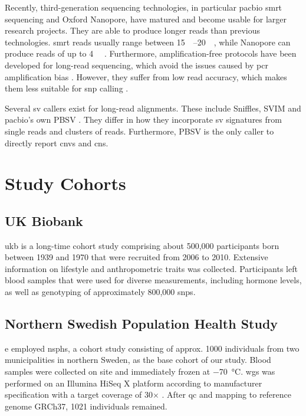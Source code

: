 \documentclass[twoside=false]{scrbook}
\begin{document}
Recently, third-generation sequencing technologies, in particular \gls{pacbio} \gls{smrt} sequencing and Oxford Nanopore, have matured and become usable for larger research projects.
They are able to produce longer reads than previous technologies.
\Gls{smrt} reads usually range between \qtyrange{15}{20}{\kilo\base}, while Nanopore can produce reads of up to \qty{4}{\mega\base} \cite{Wenger2019,Payne2019}.
Furthermore, amplification-free protocols have been developed for long-read sequencing, which avoid the issues caused by \gls{pcr} amplification bias \cite{Hoijer2018}.
However, they suffer from low read accuracy, which makes them less suitable for \gls{snp} calling \cite{Rang2018}.

Several \gls{sv} callers exist for long-read alignments.
These include \textsf{Sniffles}, \textsf{SVIM} and \gls{pacbio}'s own \textsf{PBSV} \cite{Heller2019a,Sedlazeck2018a}.
They differ in how they incorporate \gls{sv} signatures from single reads and clusters of reads.
Furthermore, \textsf{PBSV} is the only caller to directly report \glspl{cnv} and \glspl{cn}.

\section{Study Cohorts}
\subsection{UK Biobank}
\Gls{ukb} is a long-time cohort study comprising about 500,000 participants born between 1939 and 1970 that were recruited from 2006 to 2010.
Extensive information on lifestyle and anthropometric traits was collected.
Participants left blood samples that were used for diverse measurements, including hormone levels, as well as genotyping of approximately 800,000 \glspl{snp}.

\subsection{Northern Swedish Population Health Study}
e employed \gls{nsphs}, a cohort study consisting of approx. 1000 individuals from two municipalities in northern Sweden, as the base cohort of our study.
Blood samples were collected on site and immediately frozen at \qty{-70}{\celsius}.
\Gls{wgs} was performed on an Illumina HiSeq X platform according to manufacturer specification with a target coverage of 30$\times$ \cite{Ameur2017}.
After \gls{qc} and mapping to reference genome GRCh37, 1021 individuals remained.
\end{document}
